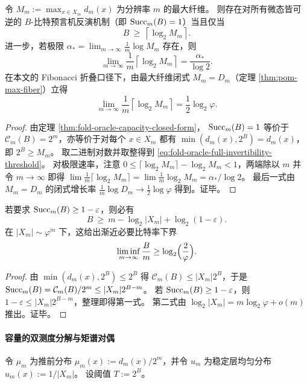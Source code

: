 \begin{corollary}[全态可逆的比特阈值与渐近速率]\label{cor:fold-oracle-full-invertibility-threshold}
令
\(
M_m:=\max_{x\in X_m} d_m(x)
\)
为分辨率 \(m\) 的最大纤维。
则存在对所有微态皆可逆的 \(B\)-比特预言机反演机制（即 \({\rm Succ}_m(B)=1\)）当且仅当
\begin{equation}\label{eq:fold-oracle-full-invertibility-threshold}
B\ \ge\ \left\lceil \log_2 M_m\right\rceil.
\end{equation}
进一步，若极限 \(\alpha_*=\lim_{m\to\infty}\frac{1}{m}\log M_m\) 存在，则
\[
\lim_{m\to\infty}\frac{1}{m}\left\lceil \log_2 M_m\right\rceil=\frac{\alpha_*}{\log 2}.
\]
在本文的 Fibonacci 折叠口径下，由最大纤维闭式 \(M_m=D_m\)（定理 \ref{thm:pom-max-fiber}）立得
\[
\lim_{m\to\infty}\frac{1}{m}\left\lceil \log_2 M_m\right\rceil=\frac12\log_2\varphi.
\]
\end{corollary}
\begin{proof}
由定理 \ref{thm:fold-oracle-capacity-closed-form}，
\({\rm Succ}_m(B)=1\) 等价于 \(\mathcal{C}_m(B)=2^m\)，亦等价于对每个 \(x\in X_m\) 都有 \(\min(d_m(x),2^B)=d_m(x)\)，即 \(2^B\ge M_m\)。
取二进制对数并取整得到 \eqref{eq:fold-oracle-full-invertibility-threshold}。
对极限速率，注意
\(
0\le \lceil \log_2 M_m\rceil-\log_2 M_m<1
\)，两端除以 \(m\) 并令 \(m\to\infty\) 即得
\(\lim \frac{1}{m}\lceil \log_2 M_m\rceil=\lim \frac{1}{m}\log_2 M_m=\alpha_*/\log 2\)。
最后一式由 \(M_m=D_m\) 的闭式增长率 \(\frac{1}{m}\log D_m\to \frac12\log\varphi\) 得到。证毕。
\end{proof}

\begin{corollary}\label{cor:fold-oracle-pigeonhole-bound}
若要求 \({\rm Succ}_m(B)\ge 1-\varepsilon\)，则必有
\[
B\ \ge\ m-\log_2|X_m|+\log_2(1-\varepsilon).
\]
在 \(|X_m|\sim \varphi^m\) 下，这给出渐近必要比特率下界
\[
\liminf_{m\to\infty}\frac{B}{m}\ge \log_2\Bigl(\frac{2}{\varphi}\Bigr).
\]
\end{corollary}

\begin{proof}
由 \(\min(d_m(x),2^B)\le 2^B\) 得 \(\mathcal{C}_m(B)\le |X_m|2^B\)，于是
\(
{\rm Succ}_m(B)=\mathcal{C}_m(B)/2^m\le |X_m|2^{B-m}
\)。
若 \({\rm Succ}_m(B)\ge 1-\varepsilon\)，则 \(1-\varepsilon\le |X_m|2^{B-m}\)，整理即得第一式。
第二式由 \(\log_2|X_m|=m\log_2\varphi+o(m)\) 推出。证毕。
\end{proof}

\paragraph{容量的双测度分解与矩谱对偶}
令 \(\mu_m\) 为推前分布 \(\mu_m(x):=d_m(x)/2^m\)，并令 \(u_m\) 为稳定层均匀分布 \(u_m(x):=1/|X_m|\)。
设阈值 \(T:=2^B\)。

